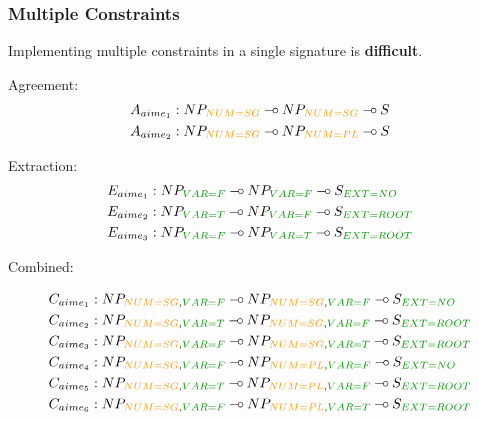 \documentclass{beamer}
\def\limp {\mathbin{{-}\mkern-3.5mu{\circ}}}
\begin{document}
\begin{frame}
  \frametitle{Multiple Constraints}

  Implementing multiple constraints in a single signature is
  \textbf{difficult}.

  Agreement:
    \begin{align*}
      A_{aime_1} &: NP_{\textcolor{darkgold}{NUM{=}SG}} \limp NP_{\textcolor{darkgold}{NUM{=}SG}} \limp S \\
      A_{aime_2} &: NP_{\textcolor{darkgold}{NUM{=}SG}} \limp NP_{\textcolor{darkgold}{NUM{=}PL}} \limp S
    \end{align*}

  Extraction:
    \begin{align*}
      E_{aime_1} &: NP_{\textcolor{darkgreen}{VAR{=}F}} \limp NP_{\textcolor{darkgreen}{VAR{=}F}} \limp S_{\textcolor{darkgreen}{EXT{=}NO}} \\
      E_{aime_2} &: NP_{\textcolor{darkgreen}{VAR{=}T}} \limp NP_{\textcolor{darkgreen}{VAR{=}F}} \limp S_{\textcolor{darkgreen}{EXT{=}ROOT}} \\
      E_{aime_3} &: NP_{\textcolor{darkgreen}{VAR{=}F}} \limp NP_{\textcolor{darkgreen}{VAR{=}T}} \limp S_{\textcolor{darkgreen}{EXT{=}ROOT}
}    \end{align*}

  Combined:
  \begin{small}
  \begin{align*}
      C_{aime_1} &: NP_{\textcolor{darkgold}{NUM{=}SG},\textcolor{darkgreen}{VAR{=}F}} \limp NP_{\textcolor{darkgold}{NUM{=}SG},\textcolor{darkgreen}{VAR{=}F}} \limp S_{\textcolor{darkgreen}{EXT{=}NO}} \\
      C_{aime_2} &: NP_{\textcolor{darkgold}{NUM{=}SG},\textcolor{darkgreen}{VAR{=}T}} \limp NP_{\textcolor{darkgold}{NUM{=}SG},\textcolor{darkgreen}{VAR{=}F}} \limp S_{\textcolor{darkgreen}{EXT{=}ROOT}} \\
      C_{aime_3} &: NP_{\textcolor{darkgold}{NUM{=}SG},\textcolor{darkgreen}{VAR{=}F}} \limp NP_{\textcolor{darkgold}{NUM{=}SG},\textcolor{darkgreen}{VAR{=}T}} \limp S_{\textcolor{darkgreen}{EXT{=}ROOT}} \\
      C_{aime_4} &: NP_{\textcolor{darkgold}{NUM{=}SG},\textcolor{darkgreen}{VAR{=}F}} \limp NP_{\textcolor{darkgold}{NUM{=}PL},\textcolor{darkgreen}{VAR{=}F}} \limp S_{\textcolor{darkgreen}{EXT{=}NO}} \\
      C_{aime_5} &: NP_{\textcolor{darkgold}{NUM{=}SG},\textcolor{darkgreen}{VAR{=}T}} \limp NP_{\textcolor{darkgold}{NUM{=}PL},\textcolor{darkgreen}{VAR{=}F}} \limp S_{\textcolor{darkgreen}{EXT{=}ROOT}} \\
      C_{aime_6} &: NP_{\textcolor{darkgold}{NUM{=}SG},\textcolor{darkgreen}{VAR{=}F}} \limp NP_{\textcolor{darkgold}{NUM{=}PL},\textcolor{darkgreen}{VAR{=}T}} \limp S_{\textcolor{darkgreen}{EXT{=}ROOT}
}  \end{align*}
  \end{small}
\end{frame}
\end{document}
